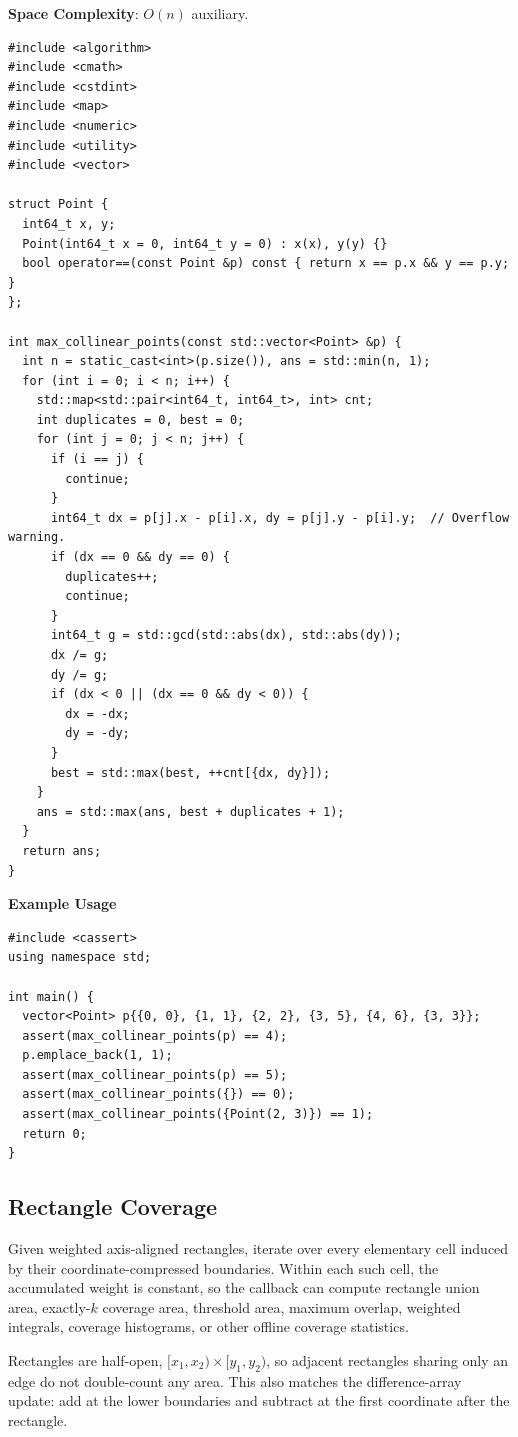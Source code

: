 \textbf{Space Complexity}: $O(n)$ auxiliary.

\begin{lstlisting}[style=cpp]
#include <algorithm>
#include <cmath>
#include <cstdint>
#include <map>
#include <numeric>
#include <utility>
#include <vector>

struct Point {
  int64_t x, y;
  Point(int64_t x = 0, int64_t y = 0) : x(x), y(y) {}
  bool operator==(const Point &p) const { return x == p.x && y == p.y; }
};

int max_collinear_points(const std::vector<Point> &p) {
  int n = static_cast<int>(p.size()), ans = std::min(n, 1);
  for (int i = 0; i < n; i++) {
    std::map<std::pair<int64_t, int64_t>, int> cnt;
    int duplicates = 0, best = 0;
    for (int j = 0; j < n; j++) {
      if (i == j) {
        continue;
      }
      int64_t dx = p[j].x - p[i].x, dy = p[j].y - p[i].y;  // Overflow warning.
      if (dx == 0 && dy == 0) {
        duplicates++;
        continue;
      }
      int64_t g = std::gcd(std::abs(dx), std::abs(dy));
      dx /= g;
      dy /= g;
      if (dx < 0 || (dx == 0 && dy < 0)) {
        dx = -dx;
        dy = -dy;
      }
      best = std::max(best, ++cnt[{dx, dy}]);
    }
    ans = std::max(ans, best + duplicates + 1);
  }
  return ans;
}
\end{lstlisting}
\textbf{Example Usage}\par
\begin{lstlisting}[style=cpp]
#include <cassert>
using namespace std;

int main() {
  vector<Point> p{{0, 0}, {1, 1}, {2, 2}, {3, 5}, {4, 6}, {3, 3}};
  assert(max_collinear_points(p) == 4);
  p.emplace_back(1, 1);
  assert(max_collinear_points(p) == 5);
  assert(max_collinear_points({}) == 0);
  assert(max_collinear_points({Point(2, 3)}) == 1);
  return 0;
}
\end{lstlisting}
\subsection{Rectangle Coverage}
\label{sec:7.3.8}
Given weighted axis-aligned rectangles, iterate over every elementary cell induced by their coordinate-compressed boundaries. Within each such cell, the accumulated weight is constant, so the callback can compute rectangle union area, exactly-$k$ coverage area, threshold area, maximum overlap, weighted integrals, coverage histograms, or other offline coverage statistics.

Rectangles are half-open, $[x_1, x_2) \times [y_1, y_2)$, so adjacent rectangles sharing only an edge do not double-count any area. This also matches the difference-array update: add at the lower boundaries and subtract at the first coordinate after the rectangle.

